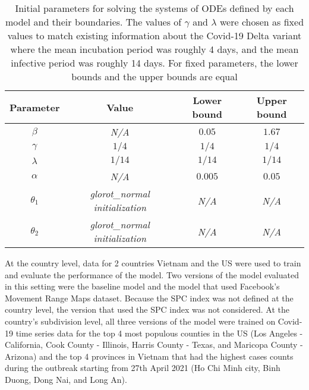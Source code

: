 \begin{table}[h]
    \centering
    \begin{tabular}{| c | c | c | c |}
        Parameter & Value & Lower bound & Upper bound \\
        \hline\hline
        $\beta$ & \textit{N/A} & $0.05$ & $1.67$ \\
        \hline
        $\gamma$ & $1/4$ & $1/4$ & $1/4$ \\
        \hline
        $\lambda$ & $1/14$ & $1/14$ & $1/14$ \\
        \hline
        $\alpha$ & \textit{N/A} & $0.005$ & $0.05$ \\
        \hline
        $\theta_1$ & \textit{glorot\_normal initialization} & \textit{N/A} & \textit{N/A} \\
        \hline
        $\theta_2$ & \textit{glorot\_normal initialization} & \textit{N/A} & \textit{N/A} \\
        \hline
    \end{tabular}
    \caption{Initial parameters for solving the systems of \glspl{ODE} defined by each model and their boundaries. The values of $\gamma$ and $\lambda$ were chosen as fixed values to match existing information about the Covid-19 Delta variant \cite{mahaseDeltaVariantWhat2021} where the mean incubation period was roughly 4 days, and the mean infective period was roughly 14 days. For fixed parameters, the lower bounds and the upper bounds are equal}
    \label{tab:ude-model-initial-parameters}
\end{table}

At the country level, data for 2 countries Vietnam and the \gls{US} were used to train and evaluate the performance of the model.
Two versions of the model evaluated in this setting were the baseline model and the model that used Facebook's Movement Range Maps dataset.
Because the \gls{SPC} index was not defined at the country level, the version that used the \gls{SPC} index was not considered.
At the country's subdivision level, all three versions of the model were trained on Covid-19 time series data for the top 4 most populous counties in the \gls{US} (Los Angeles - California, Cook County - Illinois, Harris County - Texas, and Maricopa County - Arizona) and the top 4 provinces in Vietnam that had the highest cases counts during the outbreak starting from 27th April 2021 (Ho Chi Minh city, Binh Duong, Dong Nai, and Long An).

